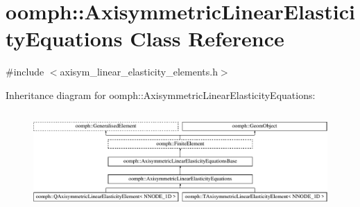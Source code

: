 \hypertarget{classoomph_1_1AxisymmetricLinearElasticityEquations}{}\section{oomph\+:\+:Axisymmetric\+Linear\+Elasticity\+Equations Class Reference}
\label{classoomph_1_1AxisymmetricLinearElasticityEquations}


{\ttfamily \#include $<$axisym\+\_\+linear\+\_\+elasticity\+\_\+elements.\+h$>$}

Inheritance diagram for oomph\+:\+:Axisymmetric\+Linear\+Elasticity\+Equations\+:\begin{figure}[H]
\begin{center}
\leavevmode
\includegraphics[height=3.794038cm]{classoomph_1_1AxisymmetricLinearElasticityEquations}
\end{center}
\end{figure}
